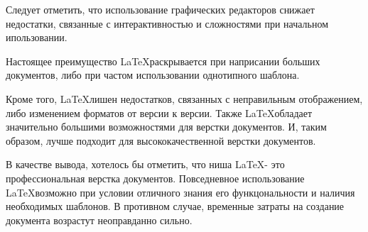 \documentclass{article}
\begin{document}
Следует отметить, что использование графических редакторов снижает недостатки, связанные с интерактивностью и сложностями при начальном ипользовании. 

Настоящее преимущество \LaTeX раскрывается при наприсании больших документов, либо при частом использовании однотипного шаблона.

Кроме того, \LaTeX лишен недостатков, связанных с неправильным отображением, либо изменением форматов от версии к версии. Также \LaTeX обладает значительно большими возможностями для верстки документов. И, таким образом, лучше подходит для высококачественной верстки документов.

В качестве вывода, хотелось бы отметить, что ниша \LaTeX - это профессиональная верстка документов. Повседневное использование \LaTeX возможно при условии отличного знания его функцональности и наличия необходимых шаблонов. В противном случае, временные затраты на создание документа возрастут неоправданно сильно.
\end{document}
